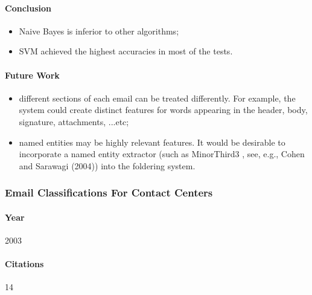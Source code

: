 \documentclass[12pt]{article}
\begin{document}
\paragraph{Conclusion}
\begin{itemize}
    \item Naive Bayes is inferior to other algorithms;
    \item SVM achieved the highest accuracies in most of the tests.
\end{itemize}

\paragraph{Future Work}
\begin{itemize}
    \item different sections of each email can be treated differently. 
	  For example, the system could create distinct features for words appearing 
	  in the header, body, signature, attachments, ...etc;
    \item named entities may be highly relevant features. It would be desirable to 
	  incorporate a named entity extractor (such as MinorThird3 , see, e.g., 
	  Cohen and Sarawagi (2004)) into the foldering system.
\end{itemize}




\subsubsection{Email Classifications For Contact Centers \cite{ANI03}}
\paragraph{Year} 2003
\paragraph{Citations} 14
\end{document}
